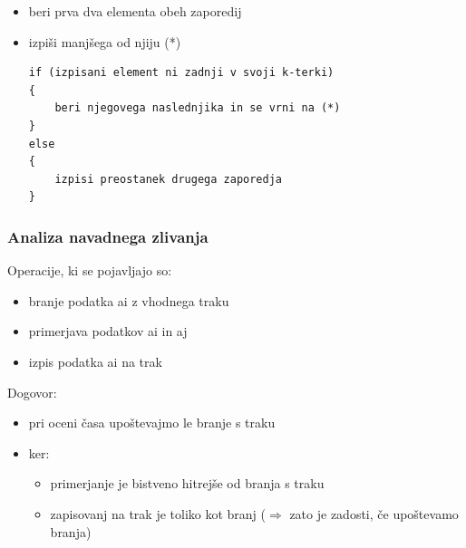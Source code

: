 \documentclass[a4paper,10pt]{article}
\begin{document}
\begin{itemize}
	\item beri prva dva elementa obeh zaporedij
	\item izpi\v si manj\v sega od njiju (*) \\
\begin{lstlisting}
if (izpisani element ni zadnji v svoji k-terki)
{
    beri njegovega naslednjika in se vrni na (*)
}
else
{
    izpisi preostanek drugega zaporedja
}
\end{lstlisting}
\end{itemize}

\subsubsection{Analiza navadnega zlivanja}
Operacije, ki se pojavljajo so:
\begin{itemize}
	\item branje podatka ai z vhodnega traku
	\item primerjava podatkov ai in aj
	\item izpis podatka ai na trak
\end{itemize}
Dogovor:
\begin{itemize}
	\item pri oceni \v casa upo\v stevajmo le branje s traku
	\item ker:
	\begin{itemize}
	\item primerjanje je bistveno hitrej\v se od branja s traku
	\item zapisovanj na trak je toliko kot branj ($\Rightarrow$ zato je zadosti, \v ce upo\v stevamo branja)
	\end{itemize}

\end{itemize}
\end{document}
